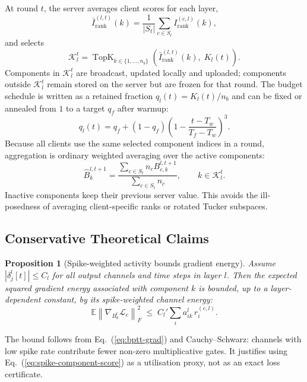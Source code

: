 \documentclass{article} %
\newtheorem{proposition}{Proposition}
\begin{document}
At round $t$, the server averages client scores for each layer,
\begin{equation}
\bar I_{\text{rank}}^{(l,t)}(k)=\frac{1}{|S_t|}\sum_{c\in S_t} I_{\text{rank}}^{(c,l)}(k),
\label{eq:score-average}
\end{equation}
and selects
\begin{equation}
\mathcal{K}_l^t = \operatorname{TopK}_{k\in\{1,\dots,n_b\}}\left(\bar I_{\text{rank}}^{(l,t)}(k),\; K_l(t)\right).
\label{eq:topk-selection}
\end{equation}
Components in $\mathcal{K}_l^t$ are broadcast, updated locally and uploaded; components outside $\mathcal{K}_l^t$ remain stored on the server but are frozen for that round. The budget schedule is written as a retained fraction $q_l(t)=K_l(t)/n_b$ and can be fixed or annealed from $1$ to a target $q_f$ after warmup:
\begin{equation}
q_l(t)=q_f+(1-q_f)\left(1-\frac{t-T_w}{T_f-T_w}\right)^3.
\label{eq:budget-schedule}
\end{equation}
Because all clients use the same selected component indices in a round, aggregation is ordinary weighted averaging over the active components:
\begin{equation}
\hat B_k^{l,t+1}=\frac{\sum_{c\in S_t} n_c B_{c,k}^{l,t+1}}{\sum_{c\in S_t} n_c},\qquad k\in\mathcal{K}_l^t.
\label{eq:component-agg}
\end{equation}
Inactive components keep their previous server value. This avoids the ill-posedness of averaging client-specific ranks or rotated Tucker subspaces.

\subsection{Conservative Theoretical Claims}
\label{sec:method-theory}

\begin{proposition}[Spike-weighted activity bounds gradient energy]
\label{prop:component-bound}
Assume $|\delta_j^l[t]|\le C_l$ for all output channels and time steps in layer $l$. Then the expected squared gradient energy associated with component $k$ is bounded, up to a layer-dependent constant, by its spike-weighted channel energy:
\begin{equation}
\mathbb{E}\left\|\nabla_{B_k^l}\mathcal{L}_c\right\|_F^2
\;\le\; C_l' \sum_i a_{ik}^{l}\, r_i^{(c,l)}.
\label{eq:component-bound}
\end{equation}
\end{proposition}
The bound follows from Eq.~(\ref{eq:bptt-grad}) and Cauchy--Schwarz: channels with low spike rate contribute fewer non-zero multiplicative gates. It justifies using Eq.~(\ref{eq:spike-component-score}) as a utilisation proxy, not as an exact loss certificate.
\end{document}
